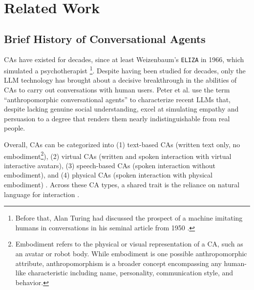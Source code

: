 \documentclass[lettersize,journal]{IEEEtran}
\begin{document}
\section{Related Work}

\subsection{Brief History of Conversational Agents}
CAs have existed for decades, since at least Weizenbaum's \texttt{ELIZA} in 1966, which simulated a psychotherapist \cite{weizenbaum_elizacomputer_1966}\footnote{Before that, Alan Turing had discussed the prospect of a machine imitating humans in conversations in his seminal article from 1950 \cite{turing_computing_1950}.}. Despite having been studied for decades, only the LLM technology has brought about a decisive breakthrough in the abilities of CAs to carry out conversations with human users. Peter et al. \cite{peter_benefits_2025} use the term ``anthropomorphic conversational agents'' to characterize recent LLMs that, despite lacking genuine social understanding, excel at simulating empathy and persuasion to a degree that renders them nearly indistinguishable from real people. %

Overall, %
CAs can be categorized into (1) text-based CAs (written text only, no embodiment\footnote{Embodiment refers to the physical or visual representation of a CA, such as an avatar or robot body. While embodiment is one possible anthropomorphic attribute, anthropomorphism is a broader concept encompassing any human-like characteristic including name, personality, communication style, and behavior.}), (2) virtual CAs (written and spoken interaction with virtual interactive avatars), (3) speech-based CAs (spoken interaction without embodiment), and (4) physical CAs (spoken interaction with physical embodiment) \cite{diederich_design_2022}. 
Across these CA types, a shared trait is the reliance on natural language for interaction \cite{diederich_design_2022}. 
\end{document}
